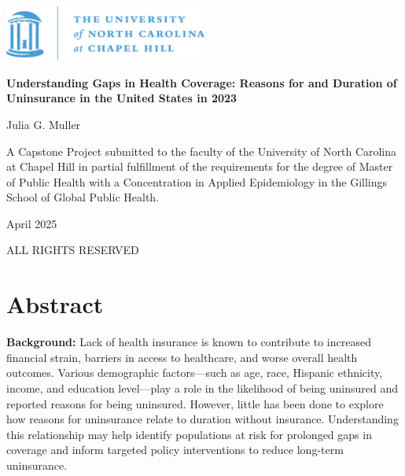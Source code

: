 \documentclass[12pt]{article}
\newcommand{\documentgeometry}{\newgeometry{top=1in, bottom=1in, left=1in, right=1in}}
\begin{document}
\begin{titlepage}
    \centering
    \vspace*{-2cm}
    \includegraphics[width=0.5\textwidth]{reports/unc-logo.png}\par
    \vspace{0.5cm}
    {\Huge\bfseries Understanding Gaps in Health Coverage: Reasons for and Duration of Uninsurance in the United States in 2023 \par}
    \vspace{2cm}
    {\LARGE Julia G. Muller\par}
    \vspace{1cm}
    {\large A Capstone Project submitted to the faculty of the University of North Carolina at Chapel Hill in partial fulfillment of the requirements
for the degree of Master of Public Health with a Concentration in Applied Epidemiology in the Gillings School of Global Public Health. \par}
    \vspace{1cm}
    {\large April 2025\par}
\end{titlepage}


\newpage
\begin{center}
  \null\vfill

  ALL RIGHTS RESERVED
  \vspace{1cm}
\end{center}


\newpage
\documentgeometry
\tableofcontents


\newpage
\section{Abstract}

\textbf{Background:} Lack of health insurance is known to contribute to increased financial strain, barriers in access to healthcare, and worse overall health outcomes. Various demographic factors—such as age, race, Hispanic ethnicity, income, and education level—play a role in the likelihood of being uninsured and reported reasons for being uninsured. However, little has been done to explore how reasons for uninsurance relate to duration without insurance. Understanding this relationship may help identify populations at risk for prolonged gaps in coverage and inform targeted policy interventions to reduce long-term uninsurance.
\end{document}
